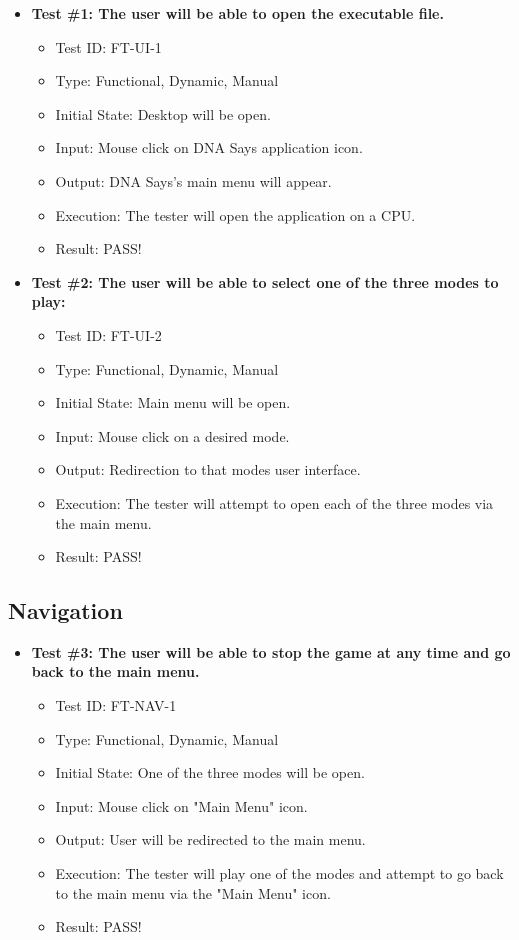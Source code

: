\documentclass[12pt, titlepage]{article}
\begin{document}
\begin{itemize}


\item \textbf{Test \#1: The user will be able to open the executable file.}
\begin{itemize}
\item Test ID: FT-UI-1
\item Type: Functional, Dynamic, Manual		
\item Initial State: Desktop will be open. 					
\item Input: Mouse click on DNA Says application icon. 					
\item Output: DNA Says's main menu will appear. 					
\item Execution: The tester will open the application on a CPU.
\item Result: PASS!
\end{itemize}

\item \textbf{Test \#2: The user will be able to select one of the three modes to play:} 
\begin{itemize}
\item Test ID: FT-UI-2
\item Type: Functional, Dynamic, Manual 		
\item Initial State: Main menu will be open. 					
\item Input: Mouse click on a desired mode. 					
\item Output: Redirection to that modes user interface.					
\item Execution: The tester will attempt to open each of the three modes via the main menu.
\item Result: PASS!
\end{itemize}

\end{itemize}


\subsection{Navigation}

\begin{itemize}

\item \textbf{Test \#3: The user will be able to stop the game at any time and go back to the main menu.}
\begin{itemize}
\item Test ID: FT-NAV-1
\item Type: Functional, Dynamic, Manual 		
\item Initial State: One of the three modes will be open.					
\item Input: Mouse click on "Main Menu" icon.					
\item Output: User will be redirected to the main menu.					
\item Execution: The tester will play one of the modes and attempt to go back to the main menu via the "Main Menu" icon.
\item Result: PASS!
\end{itemize}

\end{itemize}
\end{document}
